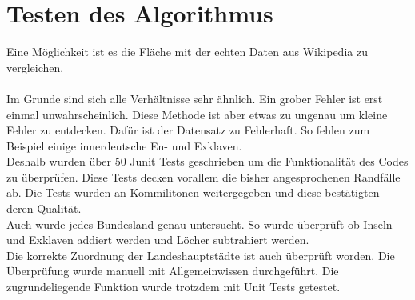 \documentclass[conference]{IEEEtran}
\begin{document}
	\section{Testen des Algorithmus}
	Eine Möglichkeit ist es die Fläche mit der echten Daten aus Wikipedia zu vergleichen.\\
	\vspace{0.2cm}
	\\
	Im Grunde sind sich alle Verhältnisse sehr ähnlich. Ein grober Fehler ist erst einmal unwahrscheinlich. Diese Methode ist aber etwas zu ungenau um kleine Fehler zu entdecken. Dafür ist der Datensatz zu Fehlerhaft. So fehlen zum Beispiel einige innerdeutsche En- und Exklaven.\\
	Deshalb wurden über 50 Junit Tests geschrieben um die Funktionalität des Codes zu überprüfen. Diese Tests decken vorallem die bisher angesprochenen Randfälle ab. Die Tests wurden an Kommilitonen weitergegeben und diese bestätigten deren Qualität.\\
	Auch wurde jedes Bundesland genau untersucht. So wurde überprüft ob Inseln und Exklaven addiert werden und Löcher subtrahiert werden.\\
	Die korrekte Zuordnung der Landeshauptstädte ist auch überprüft worden. Die Überprüfung wurde manuell mit Allgemeinwissen durchgeführt. Die zugrundeliegende Funktion wurde trotzdem mit Unit Tests getestet. 
	
\end{document}
